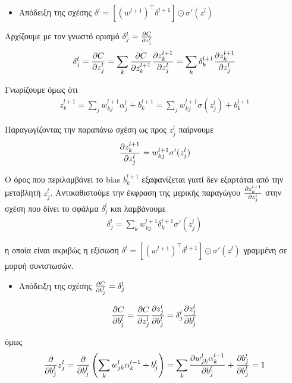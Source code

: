 \documentclass[11pt]{article} %
\numberwithin{equation}{subsection}
\begin{document}
\begin{itemize}
\item Απόδειξη της σχέσης $\delta^{l} = \left[(w^{l+1})^\intercal \delta^{l+1}\right] \odot \sigma'(z^{l})$
\end{itemize}
Αρχίζουμε με τον γνωστό ορισμό $\delta_{j}^{l} = \pdv{C}{z_{j}^{l}}$\\

\begin{align*}
\displaystyle \delta_{j}^{l} = \pdv{C}{z_{j}^{l}} = \sum_{k} \pdv{C}{z_{k}^{l+1}} \pdv{z_{k}^{l+1}}{z_{j}^{l}} = \sum_{k} \delta_{k}^{l+1} \pdv{z_{k}^{l+1}}{z_{j}^{l}}
\end{align*}

Γνωρίζουμε όμως ότι 
\begin{align*}
\displaystyle z_{k}^{l+1} = \sum_{j} w_{kj}^{l+1} \alpha_{j}^{l} + b_{k}^{l+1} = \sum_{j} w_{kj}^{l+1} \sigma (z_{j}^{l}) + b_{k}^{l+1}
\end{align*}

Παραγωγίζοντας την παραπάνω σχέση ως προς $z_{j}^{l}$ παίρνουμε 
\begin{align*}
\pdv{z_{k}^{l+1}}{z_{j}^{l}} = w_{kj}^{l+1} \sigma' (z_{j}^{l})
\end{align*}

Ο όρος που περιλαμβάνει το bias $b_{k}^{l+1}$ εξαφανίζεται γιατί δεν εξαρτάται από την μεταβλητή $z_{j}^{l}$. Αντικαθιστούμε την έκφραση της μερικής παραγώγου $\pdv{z_{k}^{l+1}}{z_{j}^{l}}$ στην σχέση που δίνει το σφάλμα $\delta_{j}^{l}$ και λαμβάνουμε
\begin{align*}
\displaystyle \delta_{j}^{l} = \sum_{k} w_{kj}^{l+1} \delta_{k}^{l+1} \sigma' (z_{j}^{l})
\end{align*}

η οποία είναι ακριβώς η εξίσωση $\delta^{l} = \left[(w^{l+1})^\intercal \delta^{l+1}\right] \odot \sigma'(z^{l})$ γραμμένη σε μορφή συνιστωσών.

\begin{itemize}
\item Απόδειξη της σχέσης $\pdv{C}{b_{j}^{l}} = \delta_{j}^{l}$
\end{itemize}
\begin{align*}
\pdv{C}{b_{j}^{l}} = \pdv{C}{z_{j}^{l}} \pdv{z_{j}^{l}}{b_{j}^{l}} = \delta_{j}^{l} \pdv{z_{j}^{l}}{b_{j}^{l}}
\end{align*}

όμως 
\begin{align*}
\displaystyle \pdv{}{b_{j}^{l}} z_{j}^{l} = \pdv{}{b_{j}^{l}} \left( \sum_{k} w_{jk}^{l} \alpha_{k}^{l-1} + b_{j}^{l}\right) = \sum_{k} \pdv{w_{jk}^{l} \alpha_{k}^{l-1}}{b_{j}^{l}} + \pdv{ b_{j}^{l}}{ b_{j}^{l}} = 1
\end{align*}
\end{document}
